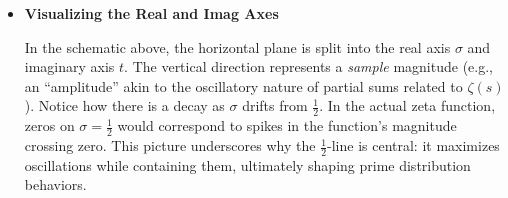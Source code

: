 \documentclass{article}
\begin{document}
\begin{center}
\end{center}

\begin{itemize}
    \item \textbf{Visualizing the Real and Imag Axes}
    \par
    In the schematic above, the horizontal plane is split into the real axis \(\sigma\) and imaginary axis \(t\). The vertical direction represents a \textit{sample} magnitude (e.g., an “amplitude” akin to the oscillatory nature of partial sums related to \(\zeta(s)\)). Notice how there is a decay as \(\sigma\) drifts from \(\tfrac12\). In the actual zeta function, zeros on \(\sigma = \tfrac12\) would correspond to spikes in the function’s magnitude crossing zero. This picture underscores why the \(\tfrac12\)-line is central: it maximizes oscillations while containing them, ultimately shaping prime distribution behaviors.
\end{itemize}
\end{document}
